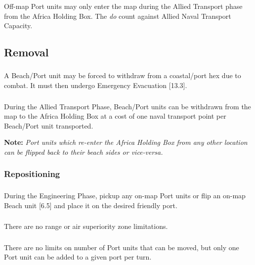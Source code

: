 \subsubsection{}
Off-map Port units may only enter the map during the Allied Transport phase from the Africa Holding Box. The \textit{do} count against Allied Naval Transport Capacity.

\subsection{Removal}

\subsubsection{}
A Beach/Port unit may be forced to withdraw from a coastal/port hex due to combat. It must then undergo Emergency Evacuation [13.3].

\subsubsection{}
During the Allied Transport Phase, Beach/Port units can be withdrawn from the map to the Africa Holding Box at a cost of one naval transport point per Beach/Port unit transported.

\textbf{Note:} \textit{Port units which re-enter the Africa Holding Box from any other location can be flipped back to their beach sides or vice-versa.}

\subsubsection{Repositioning}

\subsubsection{}
During the Engineering Phase, pickup any on-map Port units or flip an on-map Beach unit [6.5] and place it on the desired friendly port.

\subsubsection{}
There are no range or air superiority zone limitations.

\subsubsection{}
There are no limits on number of Port units that can be moved, but only one Port unit can be added to a given port per turn.

